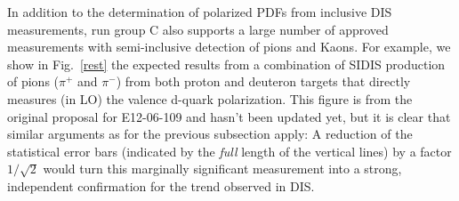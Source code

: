 In addition to the determination of polarized PDFs from inclusive DIS measurements,  run group C also supports a large number
of approved measurements with semi-inclusive detection of pions and Kaons. For example, we show in Fig.~\ref{rest} the
expected results from a combination of SIDIS production of pions ($\pi^+$ and $\pi^-$) from both proton and deuteron targets
that directly measures (in LO) the valence d-quark polarization. This figure is from the original proposal for E12-06-109
and hasn't been updated yet, but it is clear that similar arguments as for the previous subsection apply: A reduction of the 
statistical error bars (indicated by the {\em full} length of the vertical lines) by a factor $1/\sqrt{2}$ would turn this marginally
significant measurement into a strong, independent confirmation for the trend observed in DIS.

